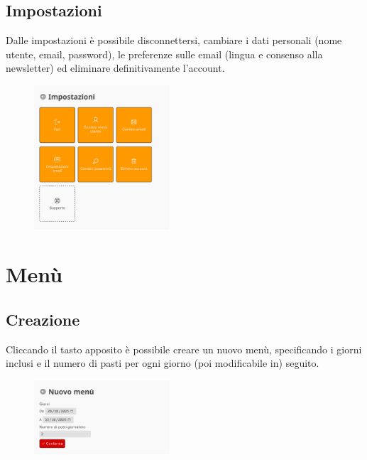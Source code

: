 \documentclass[12pt, a4paper]{article}
\begin{document}
    \subsection{Impostazioni}

    Dalle impostazioni è possibile disconnettersi, cambiare i dati personali
    (nome utente, email, password), le preferenze sulle email
    (lingua e consenso alla newsletter) ed eliminare definitivamente l'account.

    \begin{figure}[H]
        \centering
        \includegraphics[width=0.45\textwidth]{assets/it/settings.png}
    \end{figure}


    \section{Menù} \label{menus}

    \subsection{Creazione}

    Cliccando il tasto apposito è possibile creare un nuovo menù, specificando
    i giorni inclusi e il numero di pasti per ogni giorno (poi modificabile in)
    seguito.

    \begin{figure}[H]
        \centering
        \includegraphics[width=0.45\textwidth]{assets/it/menu_new.png}
    \end{figure}
\end{document}
